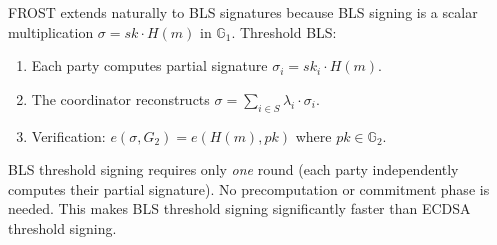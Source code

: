 FROST extends naturally to BLS signatures because BLS signing is a scalar
multiplication $\sigma = sk \cdot H(m)$ in $\mathbb{G}_1$. Threshold BLS:

\begin{enumerate}[leftmargin=2em]
  \item Each party computes partial signature $\sigma_i = sk_i \cdot H(m)$.
  \item The coordinator reconstructs $\sigma = \sum_{i \in S} \lambda_i \cdot \sigma_i$.
  \item Verification: $e(\sigma, G_2) = e(H(m), pk)$ where $pk \in \mathbb{G}_2$.
\end{enumerate}

BLS threshold signing requires only \emph{one} round (each party independently
computes their partial signature). No precomputation or commitment phase is needed.
This makes BLS threshold signing significantly faster than ECDSA threshold signing.

